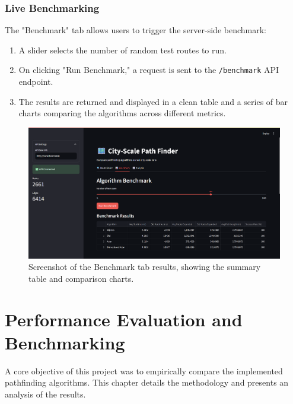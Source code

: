 \documentclass[12pt, a4paper]{report}
\begin{document}
\subsection{Live Benchmarking}
The "Benchmark" tab allows users to trigger the server-side benchmark:
\begin{enumerate}
    \item A slider selects the number of random test routes to run.
    \item On clicking "Run Benchmark," a request is sent to the \texttt{/benchmark} API endpoint.
    \item The results are returned and displayed in a clean table and a series of bar charts comparing the algorithms across different metrics.
\end{enumerate}

\begin{figure}[h!]
    \centering
    \includegraphics[width=0.9\linewidth]{figures/benchmark_tab.png}
    \caption{Screenshot of the Benchmark tab results, showing the summary table and comparison charts.}
    \label{fig:benchmark_ui}
\end{figure}

\clearpage
\chapter{Performance Evaluation and Benchmarking}

A core objective of this project was to empirically compare the implemented pathfinding algorithms. This chapter details the methodology and presents an analysis of the results.
\end{document}
